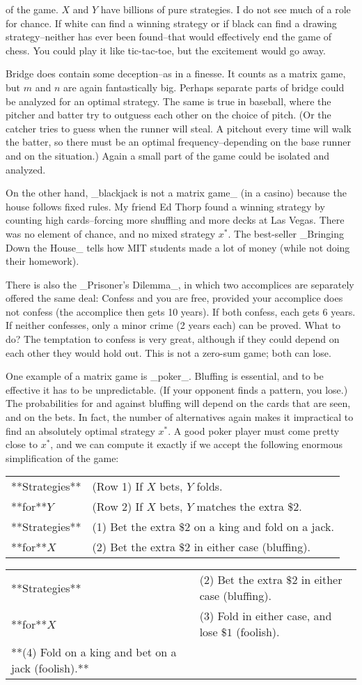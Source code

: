 of the game. \(X\) and \(Y\) have billions of pure strategies. I do not see much of a role for chance. If white can find a winning strategy or if black can find a drawing strategy--neither has ever been found--that would effectively end the game of chess. You could play it like tic-tac-toe, but the excitement would go away.

Bridge does contain some deception--as in a finesse. It counts as a matrix game, but \(m\) and \(n\) are again fantastically big. Perhaps separate parts of bridge could be analyzed for an optimal strategy. The same is true in baseball, where the pitcher and batter try to outguess each other on the choice of pitch. (Or the catcher tries to guess when the runner will steal. A pitchout every time will walk the batter, so there must be an optimal frequency--depending on the base runner and on the situation.) Again a small part of the game could be isolated and analyzed.

On the other hand, _blackjack is not a matrix game_ (in a casino) because the house follows fixed rules. My friend Ed Thorp found a winning strategy by counting high cards--forcing more shuffling and more decks at Las Vegas. There was no element of chance, and no mixed strategy \(x^{*}\). The best-seller _Bringing Down the House_ tells how MIT students made a lot of money (while not doing their homework).

There is also the _Prisoner's Dilemma_, in which two accomplices are separately offered the same deal: Confess and you are free, provided your accomplice does not confess (the accomplice then gets 10 years). If both confess, each gets 6 years. If neither confesses, only a minor crime (2 years each) can be proved. What to do? The temptation to confess is very great, although if they could depend on each other they would hold out. This is not a zero-sum game; both can lose.

One example of a matrix game is _poker_. Bluffing is essential, and to be effective it has to be unpredictable. (If your opponent finds a pattern, you lose.) The probabilities for and against bluffing will depend on the cards that are seen, and on the bets. In fact, the number of alternatives again makes it impractical to find an absolutely optimal strategy \(x^{*}\). A good poker player must come pretty close to \(x^{*}\), and we can compute it exactly if we accept the following enormous simplification of the game:

\begin{tabular}{l l}
**Strategies** & (Row 1) If \(X\) bets, \(Y\) folds. \\
**for**\(Y\) & (Row 2) If \(X\) bets, \(Y\) matches the extra \(\$2\). \\
**Strategies** & (1) Bet the extra \(\$2\) on a king and fold on a jack. \\
**for**\(X\) & (2) Bet the extra \(\$2\) in either case (bluffing). \\ \end{tabular}

\begin{tabular}{l l}
**Strategies** & (2) Bet the extra \(\$2\) in either case (bluffing). \\
**for**\(X\) & (3) Fold in either case, and lose \(\$1\) (foolish). \\
**(4) Fold on a king and bet on a jack (foolish).** \\ \end{tabular}

 